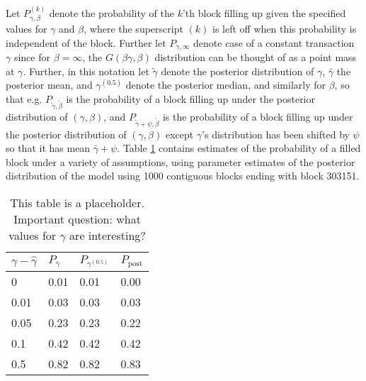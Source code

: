 \documentclass{article}
\begin{document}
Let $P_{\gamma,\beta}^{(k)}$ denote the probability of the $k$'th block filling up given the specified values for $\gamma$ and $\beta$, where the superscript $(k)$ is left off when this probability is independent of the block. Further let $P_{\gamma, \infty}$ denote case of a constant transaction $\gamma$ since for $\beta=\infty$, the $G(\beta \gamma,\beta)$ distribution can be thought of as a point mass at $\gamma$. Further, in this notation let $\tilde{\gamma}$ denote the posterior distribution of $\gamma$, $\bar{\gamma}$ the posterior mean, and $\gamma^{(0.5)}$ denote the posterior median, and similarly for $\beta$, so that e.g. $P_{\tilde{\gamma},\tilde{\beta}}$ is the probability of a block filling up under the posterior distribution of $(\gamma,\beta)$, and $P_{\tilde{\gamma} + \psi,\tilde{\beta}}$ is the probability of a block filling up under the posterior distribution of $(\gamma,\beta)$ except $\gamma$'s distribution has been shifted by $\psi$ so that it has mean $\bar{\gamma} + \psi$. Table \ref{tab:probsims} contains estimates of the probability of a filled block under a variety of assumptions, using parameter estimates of the posterior distribution of the model using 1000 contiguous blocks ending with block 303151.
\begin{table}[ht]
\centering
\begin{tabular}{llll}
  \hline
$\gamma - \hat{\gamma}$ & $P_{\bar{\gamma}}$ & $P_{\gamma^{(0.5)}}$ & $P_{\mathrm{post}}$ \\ 
  \hline
0 & 0.01 & 0.01 & 0.00 \\ 
  0.01 & 0.03 & 0.03 & 0.03 \\ 
  0.05 & 0.23 & 0.23 & 0.22 \\ 
  0.1 & 0.42 & 0.42 & 0.42 \\ 
  0.5 & 0.82 & 0.82 & 0.83 \\ 
   \hline
\end{tabular}
\caption{This table is a placeholder. Important question: what values for $\gamma$ are interesting?}
\label{tab:probsims}
\end{table}
\end{document}
